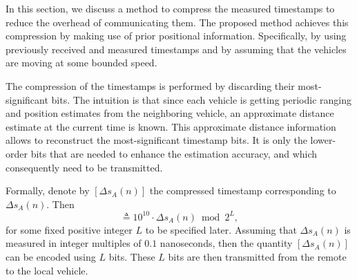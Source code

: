 \documentclass[12pt,journal,final,onecolumn]{IEEEtran}
\newcommand{\defeq}{\mathrel{\triangleq}}
\theoremstyle{definition}
\theoremstyle{myremark}
\newcommand{\dsa}{\Delta s_A}
\begin{document}
In this section, we discuss a method to compress the measured timestamps to
reduce the overhead of communicating them. The proposed method achieves this
compression by making use of prior positional information. Specifically, by
using previously received and measured timestamps and by assuming that the
vehicles are moving at some bounded speed.

The compression of the timestamps is performed by discarding their
most-significant bits. The intuition is that since each vehicle is getting
periodic ranging and position estimates from the neighboring vehicle, an
approximate distance estimate at the current time is known. This approximate
distance information allows to reconstruct the most-significant timestamp bits.
It is only the lower-order bits that are needed to enhance the estimation
accuracy, and which consequently need to be transmitted. 

Formally, denote by $[\dsa(n)]$ the compressed timestamp corresponding to
$\dsa(n)$. Then
\begin{equation*}
    [\dsa(n)] \defeq 10^{10}\cdot\dsa(n) \bmod 2^L,
\end{equation*}
for some fixed positive integer $L$ to be specified later. Assuming that
$\dsa(n)$ is measured in integer multiples of $0.1$ nanoseconds, then the
quantity $[\dsa(n)]$ can be encoded using $L$ bits. These $L$ bits are then
transmitted from the remote to the local vehicle. 
\end{document}
